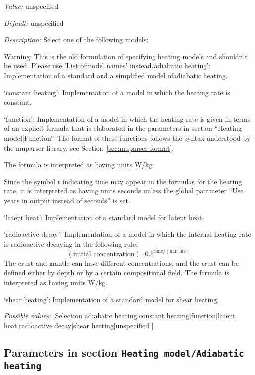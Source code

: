 \begin{itemize}
{\it Value:} unspecified


{\it Default:} unspecified


{\it Description:} Select one of the following models:

Warning: This is the old formulation of specifying heating models and shouldn't be used. Please use 'List ofmodel names' instead.`adiabatic heating': Implementation of a standard and a simplified model ofadiabatic heating.

`constant heating': Implementation of a model in which the heating rate is constant.

`function': Implementation of a model in which the heating rate is given in terms of an explicit formula that is elaborated in the parameters in section ``Heating model|Function''. The format of these functions follows the syntax understood by the muparser library, see Section~\ref{sec:muparser-format}.

The formula is interpreted as having units W/kg.

Since the symbol $t$ indicating time may appear in the formulas for the heating rate, it is interpreted as having units seconds unless the global parameter ``Use years in output instead of seconds'' is set.

`latent heat': Implementation of a standard model for latent heat.

`radioactive decay': Implementation of a model in which the internal heating rate is radioactive decaying in the following rule:
\[(\text{initial concentration})\cdot 0.5^{\text{time}/(\text{half life})}\]
The crust and mantle can have different concentrations, and the crust can be defined either by depth or by a certain compositional field.
The formula is interpreted as having units W/kg.

`shear heating': Implementation of a standard model for shear heating.


{\it Possible values:} [Selection adiabatic heating|constant heating|function|latent heat|radioactive decay|shear heating|unspecified ]
\end{itemize}



\subsection{Parameters in section \tt Heating model/Adiabatic heating}
\label{parameters:Heating_20model/Adiabatic_20heating}

